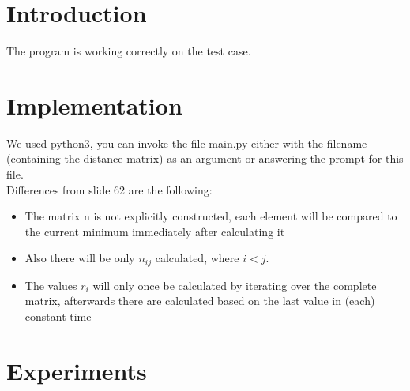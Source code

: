 \documentclass[12pt,a4paper]{article}
\begin{document}
	\section{Introduction}
	The program is working correctly on the test case.
	\section{Implementation}
	We used python3, you can invoke the file main.py either with the filename (containing the distance matrix) as an argument or answering the prompt for this file.\\
	Differences from slide 62 are the following:\\
	\begin{itemize}
		\item The matrix n is not explicitly constructed, each element will be compared to the current minimum immediately after calculating it
		\item Also there will be only $n_{ij}$ calculated, where $i<j$.
		\item The values $r_i$ will only once be calculated by iterating over the complete matrix, afterwards there are calculated based on the last value in (each) constant time
	\end{itemize}
	\section{Experiments}
	
\end{document}
